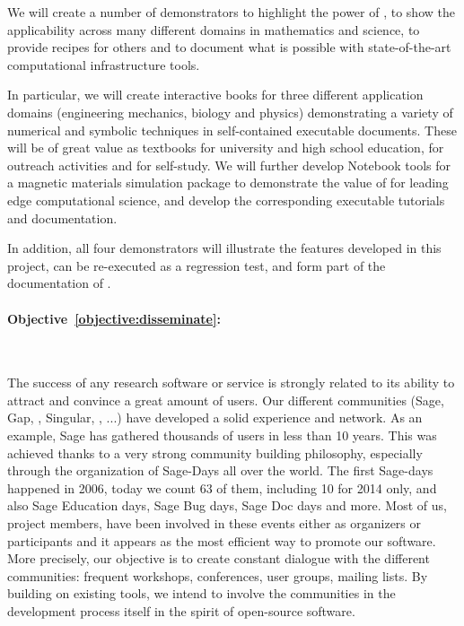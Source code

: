 \documentclass[noworkareas,deliverables,keys]{euproposal}                  %
\begin{document}
\begin{proposal}
We will create a number of demonstrators to highlight the power of
\TheProject{}, to show the applicability across many different domains
in mathematics and science, to provide recipes for others and to
document what is possible with state-of-the-art computational
infrastructure tools. 

In particular, we will create interactive books for three different
application domains (engineering mechanics, biology and physics)
demonstrating a variety of numerical and symbolic techniques in
self-contained executable documents. These will be of great value as
textbooks for university and high school education, for outreach
activities and for self-study. We will further develop Notebook tools
for a magnetic materials simulation package to demonstrate the value
of \TheProject{} for leading edge computational science, and develop
the corresponding executable tutorials and documentation. 

In addition, all four demonstrators will illustrate the features
developed in this project, can be re-executed as a regression test,
and form part of the documentation of \TheProject.

\paragraph{Objective~\ref{objective:disseminate}: }\ 

The success of any research software or service is strongly related to
its ability to attract and convince a great amount of users. Our
different communities (Sage, Gap, \PariGP, Singular, \Jupyter, ...) have developed
a solid experience and network. As an example, Sage has gathered
thousands of users in less than 10 years. This was achieved thanks to
a very strong community building philosophy, especially through the
organization of Sage-Days all over the world. The first Sage-days
happened in 2006, today we count 63 of them, including 10 for 2014
only, and also Sage Education days, Sage Bug days, Sage Doc days and
more. Most of us, \TheProject{} project members, have been involved in
these events either as organizers or participants and it appears as
the most efficient way to promote our software. More precisely, our
objective is to create constant dialogue with the different
communities: frequent workshops, conferences, user groups, mailing
lists. By building on existing tools, we intend to involve the
communities in the development process itself in the spirit of
open-source software.


\end{proposal}
\end{document}

